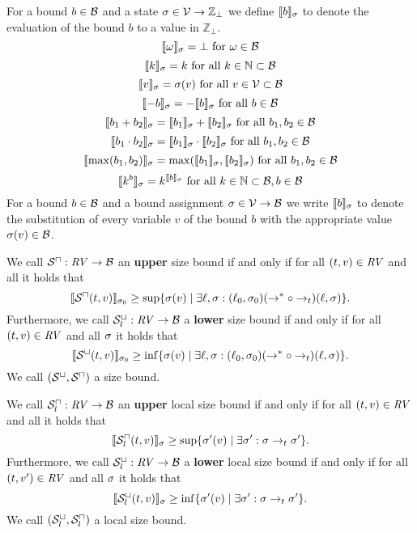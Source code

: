 \begin{definition}
  For a bound $b \in \mathcal{B}$ and a state $\sigma \in \mathcal{V} \rightarrow \mathbb{Z}_\bot$ we define $\llbracket b \rrbracket_{\sigma}$ to denote the evaluation of the bound $b$ to a value in $\mathbb{Z}_\bot$.
  \[ \llbracket \omega \rrbracket_{\sigma} = \bot \text{ for } \omega \in \mathcal{B} \] 
  \[ \llbracket k \rrbracket_{\sigma} = k \text{ for all } k \in \mathbb{N} \subset \mathcal{B} \] 
  \[ \llbracket v \rrbracket_{\sigma} = \sigma(v) \text{ for all } v \in \mathcal{V} \subset \mathcal{B} \] 
  \[ \llbracket -b \rrbracket_{\sigma} = -\llbracket b \rrbracket_{\sigma} \text{ for all } b \in \mathcal{B} \] 
  \[ \llbracket b_1 + b_2 \rrbracket_{\sigma} = \llbracket b_1 \rrbracket_{\sigma} + \llbracket b_2 \rrbracket_{\sigma} \text{ for all } b_1, b_2 \in \mathcal{B} \] 
  \[ \llbracket b_1 \cdot b_2 \rrbracket_{\sigma} = \llbracket b_1 \rrbracket_{\sigma} \cdot \llbracket b_2 \rrbracket_{\sigma} \text{ for all } b_1, b_2 \in \mathcal{B} \] 
  \[ \llbracket \max(b_1, b_2) \rrbracket_{\sigma} = \max(\llbracket b_1 \rrbracket_{\sigma}, \llbracket b_2 \rrbracket_{\sigma}) \text{ for all } b_1, b_2 \in \mathcal{B} \]
  \[ \llbracket k^b \rrbracket_{\sigma} = k^{\llbracket b \rrbracket_{\sigma}} \text{ for all } k \in \mathbb{N} \subset \mathcal{B}, b \in \mathcal{B} \]  
  For a bound $b \in \mathcal{B}$ and a bound assignment $\sigma \in \mathcal{V} \rightarrow \mathcal{B}$ we write $\llbracket b \rrbracket_{\sigma}$ to denote the substitution of every variable $v$ of the bound $b$ with the appropriate value $\sigma(v) \in \mathcal{B}$.
\end{definition}


\begin{definition}
  We call ${\mathcal{S}^\sqcap}: \mathit{RV} \rightarrow \mathcal{B}$ an \textbf{upper} size bound if and only if for all $(t, v) \in \mathit{RV}$ and all  it holds that
  \[ \llbracket {\mathcal{S}^\sqcap}(t, v) \rrbracket_{\sigma_0} \geq \sup \lbrace \sigma(v) \mid \exists \ell, \sigma: (\ell_0, \sigma_0) (\rightarrow^* \circ \rightarrow_t) (\ell, \sigma) \rbrace. \]
  Furthermore, we call ${\mathcal{S}^\sqcup_l}: \mathit{RV} \rightarrow \mathcal{B}$ a \textbf{lower} size bound if and only if for all $(t, v) \in \mathit{RV}$ and all $\sigma$ it holds that
  \[ \llbracket {\mathcal{S}^\sqcup}(t, v) \rrbracket_{\sigma_0} \geq \inf \lbrace \sigma(v) \mid \exists \ell, \sigma: (\ell_0, \sigma_0) (\rightarrow^* \circ \rightarrow_t) (\ell, \sigma) \rbrace. \]
  We call ${({\mathcal{S}^\sqcup}, {\mathcal{S}^\sqcap})}$ a size bound.
\end{definition}

\begin{definition}
  We call ${\mathcal{S}^\sqcap_l}: \mathit{RV} \rightarrow \mathcal{B}$ an \textbf{upper} local size bound if and only if for all $(t, v) \in \mathit{RV}$ and all  it holds that
  \[ \llbracket {\mathcal{S}^\sqcap_l}(t, v) \rrbracket_{\sigma} \geq \sup \lbrace \sigma'(v) \mid \exists \sigma': \sigma \rightarrow_t \sigma' \rbrace. \]
  Furthermore, we call ${\mathcal{S}^\sqcup_l}: \mathit{RV} \rightarrow \mathcal{B}$ a \textbf{lower} local size bound if and only if for all $(t, v') \in \mathit{RV}$ and all $\sigma$ it holds that
  \[ \llbracket {\mathcal{S}^\sqcup_l}(t, v) \rrbracket_{\sigma} \geq \inf \lbrace \sigma'(v) \mid \exists \sigma': \sigma \rightarrow_t \sigma' \rbrace. \]
  We call ${({\mathcal{S}^\sqcup_l}, {\mathcal{S}^\sqcap_l})}$ a local size bound.
\end{definition}
